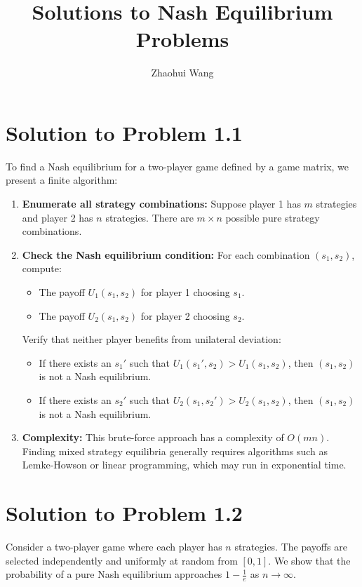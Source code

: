 \documentclass{article}
\title{Solutions to Nash Equilibrium Problems}
\author{Zhaohui Wang}
\date{}
\begin{document}
\maketitle

\section*{Solution to Problem 1.1}

To find a Nash equilibrium for a two-player game defined by a game matrix, we present a finite algorithm:

\begin{enumerate}
    \item \textbf{Enumerate all strategy combinations:} Suppose player 1 has $m$ strategies and player 2 has $n$ strategies. There are $m \times n$ possible pure strategy combinations.
    \item \textbf{Check the Nash equilibrium condition:} For each combination $(s_1, s_2)$, compute:
    \begin{itemize}
        \item The payoff $U_1(s_1, s_2)$ for player 1 choosing $s_1$.
        \item The payoff $U_2(s_1, s_2)$ for player 2 choosing $s_2$.
    \end{itemize}
    Verify that neither player benefits from unilateral deviation:
    \begin{itemize}
        \item If there exists an $s_1'$ such that $U_1(s_1', s_2) > U_1(s_1, s_2)$, then $(s_1, s_2)$ is not a Nash equilibrium.
        \item If there exists an $s_2'$ such that $U_2(s_1, s_2') > U_2(s_1, s_2)$, then $(s_1, s_2)$ is not a Nash equilibrium.
    \end{itemize}
    \item \textbf{Complexity:} This brute-force approach has a complexity of $O(mn)$. Finding mixed strategy equilibria generally requires algorithms such as Lemke-Howson or linear programming, which may run in exponential time.
\end{enumerate}

\section*{Solution to Problem 1.2}

Consider a two-player game where each player has $n$ strategies. The payoffs are selected independently and uniformly at random from $[0,1]$. We show that the probability of a pure Nash equilibrium approaches $1 - \frac{1}{e}$ as $n \to \infty$.
\end{document}
